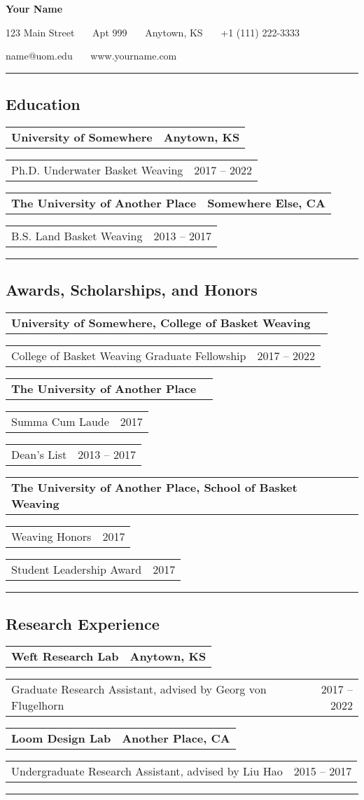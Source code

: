 \documentclass[10pt,letterpaper]{article}
\makeatletter
\newlength{\step}
\newlength{\aligngroupinlen}
\newcommand{\aligngroup}[2]
{\begin{tabular*}{\linewidth}{@{}l@{\extracolsep{\fill}}r@{}}
		#1 &
		#2 \\
\end{tabular*}}
\newcommand{\aligngroupin}[2]
{\setlength{\aligngroupinlen}{\linewidth}\addtolength{\aligngroupinlen}{-\step}\hspace*{\step}\begin{tabular*}{\aligngroupinlen}{@{}l@{\extracolsep{\fill}}r@{}}
		#1 &
		#2 \\
\end{tabular*}}
\newenvironment{indentsection}%
	{\begin{list}%
			{}%
			{\setlength{\leftmargin}{\step}%
			 \setlength{\parsep}{\parskip}%
			 \setlength{\itemsep}{0pt}%
			}%
			\item[]%
	}%
	{\end{list}}%
\makeatother
\begin{document}
\begin{center}
{\LARGE \textbf{Your Name}}

123 Main Street \ \textbullet \ \
Apt 999 \ \textbullet \ \
Anytown, KS \ \textbullet \ \
+1 (111) 222-3333

name@uom.edu \ \textbullet \ \ 
www.yourname.com
\end{center}
\hrule
\subsection*{Education}
\begin{indentsection}
		\aligngroup
			{\textbf{University of Somewhere}}
			{\textbf{Anytown, KS}}
		\aligngroupin
			{Ph.D. Underwater Basket Weaving}
			{2017 -- 2022}
		\aligngroup
			{\textbf{The University of Another Place}}
			{\textbf{Somewhere Else, CA}}
		\aligngroupin
			{B.S. Land Basket Weaving}
			{2013 -- 2017}
\end{indentsection}
\hrule
\subsection*{Awards, Scholarships, and Honors}
\begin{indentsection}
	\aligngroup
		{\textbf{University of Somewhere, College of Basket Weaving}}
		{}
	\aligngroupin
		{College of Basket Weaving Graduate Fellowship}
		{2017 -- 2022}
	\aligngroup
		{\textbf{The University of Another Place}}
		{}
	\aligngroupin
		{Summa Cum Laude}
		{2017}
	\aligngroupin
		{Dean's List}
		{2013 -- 2017}
	\aligngroup
		{\textbf{The University of Another Place, School of Basket Weaving}}
		{}
	\aligngroupin
		{Weaving Honors}
		{2017}
	\aligngroupin
		{Student Leadership Award}
		{2017}
\end{indentsection}
\hrule
\subsection*{Research Experience}
\begin{indentsection}
	\aligngroup
		{\textbf{Weft Research Lab}}
		{\textbf{Anytown, KS}}
	\aligngroupin
		{Graduate Research Assistant, advised by Georg von Flugelhorn}
		{2017 -- 2022}
	\aligngroup
		{\textbf{Loom Design Lab}}
		{\textbf{Another Place, CA}}
	\aligngroupin
		{Undergraduate Research Assistant, advised by Liu Hao}
		{2015 -- 2017}
\end{indentsection}
\hrule
\end{document}
